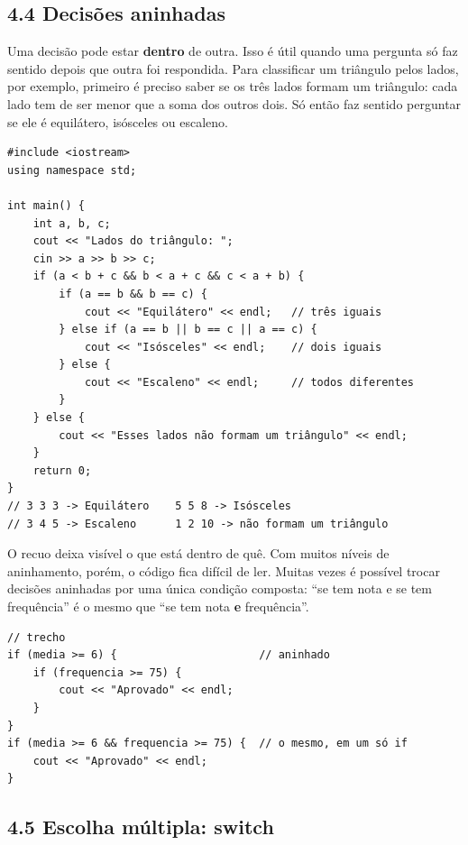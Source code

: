 \subsection{4.4 Decisões aninhadas}

Uma decisão pode estar \textbf{dentro} de outra. Isso é útil quando uma pergunta só faz sentido depois que outra foi respondida. Para classificar um triângulo pelos lados, por exemplo, primeiro é preciso saber se os três lados formam um triângulo: cada lado tem de ser menor que a soma dos outros dois. Só então faz sentido perguntar se ele é equilátero, isósceles ou escaleno.

\begin{codigo}
\begin{Verbatim}[breaklines=true, breaksymbolleft={}, fontsize=\footnotesize]
#include <iostream>
using namespace std;

int main() {
    int a, b, c;
    cout << "Lados do triângulo: ";
    cin >> a >> b >> c;
    if (a < b + c && b < a + c && c < a + b) {
        if (a == b && b == c) {
            cout << "Equilátero" << endl;   // três iguais
        } else if (a == b || b == c || a == c) {
            cout << "Isósceles" << endl;    // dois iguais
        } else {
            cout << "Escaleno" << endl;     // todos diferentes
        }
    } else {
        cout << "Esses lados não formam um triângulo" << endl;
    }
    return 0;
}
// 3 3 3 -> Equilátero    5 5 8 -> Isósceles
// 3 4 5 -> Escaleno      1 2 10 -> não formam um triângulo
\end{Verbatim}
\end{codigo}

O recuo deixa visível o que está dentro de quê. Com muitos níveis de aninhamento, porém, o código fica difícil de ler. Muitas vezes é possível trocar decisões aninhadas por uma única condição composta: ``se tem nota e se tem frequência'' é o mesmo que ``se tem nota \textbf{e} frequência''.

\begin{codigo}
\begin{Verbatim}[breaklines=true, breaksymbolleft={}, fontsize=\footnotesize]
// trecho
if (media >= 6) {                      // aninhado
    if (frequencia >= 75) {
        cout << "Aprovado" << endl;
    }
}
if (media >= 6 && frequencia >= 75) {  // o mesmo, em um só if
    cout << "Aprovado" << endl;
}
\end{Verbatim}
\end{codigo}

\subsection{4.5 Escolha múltipla: switch}

